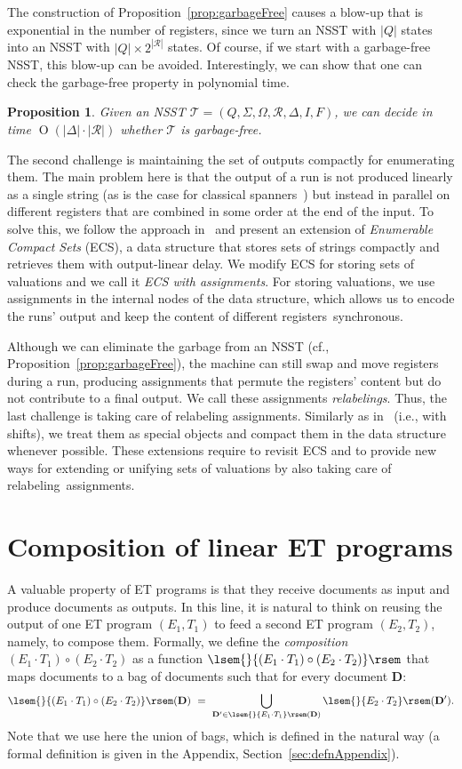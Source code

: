 \documentclass[
a4paper
]{article}
\theoremstyle{plain}
\newtheorem{proposition}[theorem]{Proposition}
\theoremstyle{definition}
\theoremstyle{remark}
\newcommand{\doc}{\ensuremath{\mathbf{D}}}
\newcommand{\Reg}{\mathcal{R}}
\newcommand{\nsst}{\mathcal{T}}
\newcommand{\sem}[1]{{\lsem{}{#1}\rsem}}
\DeclareMathOperator{\bigo}{O}
\begin{document}
The construction of Proposition~\ref{prop:garbageFree} causes a blow-up that is exponential in the number of registers, since we turn an NSST with $|Q|$ states into an NSST with $|Q| \times 2^{|\Reg|}$ states. Of course, if we start with a garbage-free NSST, this blow-up can be avoided. Interestingly, we can show that one can check the garbage-free property in polynomial time.
\begin{proposition} \label{prop:garbageFreePTime}
	Given an NSST $\nsst = (Q, \Sigma, \Omega,  \Reg, \Delta, I, F)$, we can decide in time $\bigo(|\Delta| \cdot |\Reg|)$ whether $\nsst$ is garbage-free.
\end{proposition}
The second challenge is maintaining the set of outputs compactly for enumerating them. The main problem here is that the output of a run is not produced linearly as a single string (as is the case for classical spanners~\cite{AmarilliBMN21,AmarilliBMN19}) but instead in parallel on different registers that are combined in some order 
at the end of the input. To solve this, we follow the approach in~\cite{MunozR22,MunozR23} and present an extension of \emph{Enumerable Compact Sets} (ECS), a data structure that stores sets of strings compactly and retrieves them with output-linear delay. We modify ECS for storing sets of valuations and we call it \emph{ECS with assignments}. For storing valuations, we use assignments in the internal nodes of the data structure, which allows us to encode the runs' output and keep the content of different registers~synchronous.

Although we can eliminate the garbage from an NSST
(cf., Proposition~\ref{prop:garbageFree}),
the machine can still swap and move registers during a run, producing assignments that permute the registers' content but do not contribute to a final output. We call these  assignments  \emph{relabelings}. Thus, the last challenge is taking care of relabeling assignments.
Similarly as in~\cite{MunozR23} (i.e., with shifts), we treat them as special objects and
compact
them in the data structure whenever possible.
These extensions require
to revisit ECS and to provide
new ways for extending or
unifying
sets of valuations by also taking care of relabeling~assignments.
 	
\section{Composition of linear ET programs}\label{sec:composition}
	
A valuable property of ET programs is that
they receive
documents as input and produce documents as outputs.
In this line, it is natural to think on reusing the output of one ET program $(E_1, T_1)$ to feed a second ET program $(E_2, T_2)$, namely, to compose them. Formally, we define the \emph{composition} $(E_1 \cdot T_1) \circ (E_2 \cdot T_2)$ as a function $\sem{(E_1 \cdot T_1) \circ (E_2 \cdot T_2)}$ that maps documents to a bag of documents such that for every document $\doc$:
\[
\sem{(E_1 \cdot T_1) \circ (E_2 \cdot T_2)} (\doc) \ = \ \bigcup_{\doc' \in \sem{E_1 \cdot T_1}(\doc)} \sem{E_2 \cdot T_2}(\doc').
\]
Note that we use here the union of bags, which is defined in the natural way (a formal definition is given in the Appendix, Section~\ref{sec:defnAppendix}).
\end{document}
